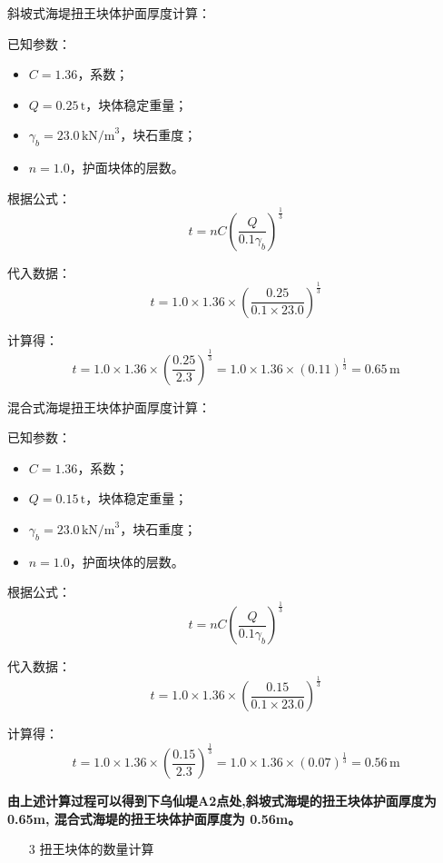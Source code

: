 \documentclass[UTF8, a4paper, 12pt]{ctexart} %
\begin{document}
斜坡式海堤扭王块体护面厚度计算：


已知参数：
\begin{itemize}
    \item $C = 1.36$，系数；
    \item $Q = 0.25\,\text{t}$，块体稳定重量；
    \item $\gamma_b = 23.0\,\text{kN/m}^3$，块石重度；
    \item $n = 1.0$，护面块体的层数。
\end{itemize}

根据公式：
\begin{equation}
    t = nC \left( \frac{Q}{0.1 \gamma_b} \right)^{\frac{1}{3}}
\end{equation}

代入数据：
\[
    t = 1.0 \times 1.36 \times \left( \frac{0.25}{0.1 \times 23.0} \right)^{\frac{1}{3}}
\]

计算得：
\[
    t = 1.0 \times 1.36 \times \left( \frac{0.25}{2.3} \right)^{\frac{1}{3}} = 1.0 \times 1.36 \times (0.11)^{\frac{1}{3}} = 0.65\,\text{m}
\]

混合式海堤扭王块体护面厚度计算：



已知参数：
\begin{itemize}
    \item $C = 1.36$，系数；
    \item $Q = 0.15\,\text{t}$，块体稳定重量；
    \item $\gamma_b = 23.0\,\text{kN/m}^3$，块石重度；
    \item $n = 1.0$，护面块体的层数。
\end{itemize}

根据公式：
\begin{equation}
    t = nC \left( \frac{Q}{0.1 \gamma_b} \right)^{\frac{1}{3}}
\end{equation}

代入数据：
\[
    t = 1.0 \times 1.36 \times \left( \frac{0.15}{0.1 \times 23.0} \right)^{\frac{1}{3}}
\]


计算得：
\[
    t = 1.0 \times 1.36 \times \left( \frac{0.15}{2.3} \right)^{\frac{1}{3}} = 1.0 \times 1.36 \times (0.07)^{\frac{1}{3}} = 0.56\,\text{m}
\]



\textbf{由上述计算过程可以得到下乌仙堤A2点处,斜坡式海堤的扭王块体护面厚度为
0.65m, 混合式海堤的扭王块体护面厚度为 0.56m。}

\begin{itemize}
    \item [3] 扭王块体的数量计算
\end{itemize}
\end{document}

